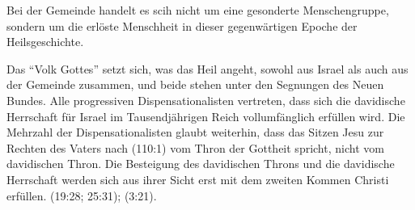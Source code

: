 \documentclass{mybib}
\begin{document}
\begin{enumerate}
    Bei der Gemeinde handelt es scih nicht um eine gesonderte Menschengruppe, sondern um die erlöste Menschheit in dieser gegenwärtigen Epoche der Heilsgeschichte. 
    
    Das \enquote{Volk Gottes} setzt sich, was das Heil angeht, sowohl aus Israel als auch aus der Gemeinde zusammen, und beide stehen unter den Segnungen des Neuen Bundes. Alle progressiven Dispensationalisten vertreten, dass sich die davidische Herrschaft für Israel im Tausendjährigen Reich vollumfänglich erfüllen wird. Die Mehrzahl der Dispensationalisten glaubt weiterhin, dass das Sitzen Jesu zur Rechten des Vaters nach (110:1) vom Thron der Gottheit spricht, nicht vom davidischen Thron. Die Besteigung des davidischen Throns und die davidische Herrschaft werden sich aus ihrer Sicht erst mit dem zweiten Kommen Christi erfüllen. (19:28; 25:31); (3:21).
\end{enumerate}
\end{document}
